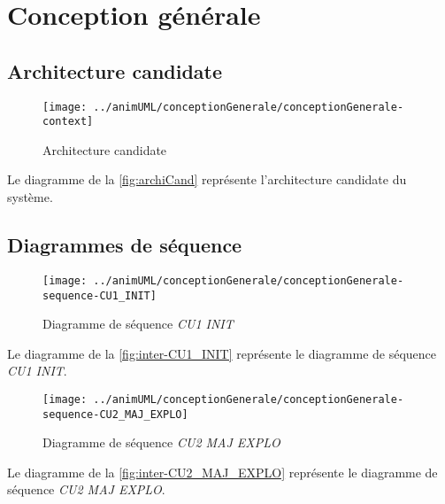 
\section{Conception générale}

\newcommand\macroSuffix{}



\subsection{Architecture candidate}

\begin{figure}[H]
	\centering
	\texttt{[image: ../animUML/conceptionGenerale/conceptionGenerale-context]}
	\caption{Architecture candidate}
	\label{fig:archiCand}
\end{figure}
Le diagramme de la \autoref{fig:archiCand} représente l'architecture candidate du système.


\subsection{Diagrammes de séquence}

\begin{figure}[H]
	\centering
	\texttt{[image: ../animUML/conceptionGenerale/conceptionGenerale-sequence-CU1\_INIT]}
	\caption{Diagramme de séquence \emph{CU1 INIT}}
	\label{fig:inter-CU1_INIT}
\end{figure}
Le diagramme de la \autoref{fig:inter-CU1_INIT} représente le diagramme de séquence \emph{CU1 INIT}.


\begin{figure}[H]
	\centering
	\texttt{[image: ../animUML/conceptionGenerale/conceptionGenerale-sequence-CU2\_MAJ\_EXPLO]}
	\caption{Diagramme de séquence \emph{CU2 MAJ EXPLO}}
	\label{fig:inter-CU2_MAJ_EXPLO}
\end{figure}
Le diagramme de la \autoref{fig:inter-CU2_MAJ_EXPLO} représente le diagramme de séquence \emph{CU2 MAJ EXPLO}.


